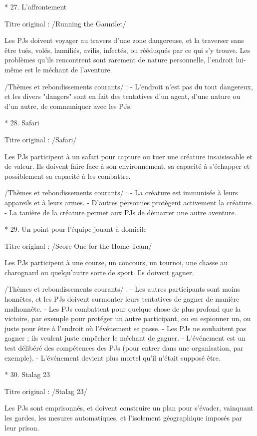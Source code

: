 \begin{enumerate}
* 27. L'affrontement

Titre original : /Running the Gauntlet/

Les PJs doivent voyager au travers d'une zone dangereuse, et la traverser sans être tués, volés, humiliés, avilis, infectés, ou rééduqués par ce qui s'y trouve. Les problèmes qu'ils rencontrent sont rarement de nature personnelle, l'endroit lui-même est le méchant de l'aventure.

/Thèmes et rebondissements courants/ :
- L'endroit n'est pas du tout dangereux, et les divers "dangers" sont en fait des tentatives d'un agent, d'une nature ou d'un autre, de communiquer avec les PJs.

* 28. Safari

Titre original : /Safari/

Les PJs participent à un safari pour capture ou tuer une créature insaisissable et de valeur. Ils doivent faire face à son environnement, sa capacité à s'échapper et possiblement sa capacité à les combattre.

/Thèmes et rebondissements courants/ :
- La créature est immunisée à leurs appareils et à leurs armes.
- D'autres personnes protègent activement la créature.
- La tanière de la créature permet aux PJs de démarrer une autre aventure.

* 29. Un point pour l'équipe jouant à domicile

Titre original : /Score One for the Home Team/

Les PJs participent à une course, un concours, un tournoi, une chasse au charognard ou quelqu'autre sorte de sport. Ils doivent gagner.

/Thèmes et rebondissements courants/ :
- Les autres participants sont moins honnêtes, et les PJs doivent surmonter leurs tentatives de gagner de manière malhonnête.
- Les PJs combattent pour quelque chose de plus profond que la victoire, par exemple pour protéger un autre participant, ou en espionner un, ou juste pour être à l'endroit où l'événement se passe.
- Les PJs ne souhaitent pas gagner ; ils veulent juste empêcher le méchant de gagner.
- L'événement est un test délibéré des compétences des PJs (pour entrer dans une organisation, par exemple).
- L'événement devient plus mortel qu'il n'était supposé être.

* 30. Stalag 23

Titre original : /Stalag 23/

Les PJs sont emprisonnés, et doivent construire un plan pour s'évader, vainquant les gardes, les mesures automatiques, et l'isolement géographique imposés par leur prison.


\end{enumerate}
